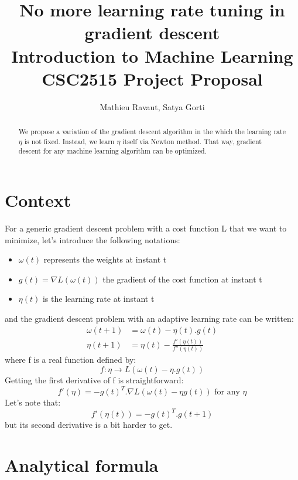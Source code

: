 \documentclass[]{article}
\title{No more learning rate tuning in gradient descent \\
\small{Introduction to Machine Learning CSC2515 Project Proposal}}
\author{Mathieu Ravaut, Satya Gorti}
\begin{document}
\maketitle

\begin{abstract}
	
We propose a variation of the gradient descent algorithm in the which the learning rate $\eta$ is not fixed. Instead, we learn $\eta$ itself via Newton method. That way, gradient descent for any machine learning algorithm can be optimized. 

\end{abstract}

\section{Context}

For a generic gradient descent problem with a cost function L that we want to minimize, let's introduce the following notations:\\
\begin{itemize}
\item $\omega(t)$ represents the weights at instant t
\item $g(t) = \nabla L(\omega(t))$ the gradient of the cost function at instant t
\item $\eta(t)$ is the learning rate at instant t
\end{itemize}
and the gradient descent problem with an adaptive learning rate can be written:\\
\begin{align}
\omega(t+1) &= \omega(t) - \eta(t).g(t)\\
\eta(t+1) &= \eta(t) - \frac{f'(\eta(t))}{f''(\eta(t))}
\end{align}
where f is a real function defined by:\\
$$f: \eta \rightarrow L(\omega(t) - \eta.g(t))$$
Getting the first derivative of f is straightforward:\\
\begin{equation}
f'(\eta) = -g(t)^{T}.\nabla L(\omega(t)-\eta g(t)) \text{ for any $\eta$}
\end{equation}
Let's note that:\\
\begin{equation}
f'(\eta(t)) = -g(t)^{T}.g(t+1)
\end{equation}
but its second derivative is a bit harder to get. 

\section{Analytical formula}
\end{document}
